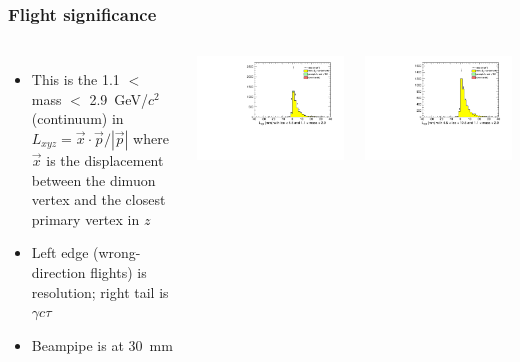 \documentclass[compress]{beamer}
\begin{document}
\begin{frame}
\frametitle{Flight significance}

\begin{columns}
\begin{itemize}
\item This is the 1.1 $<$ mass $<$ 2.9~GeV/$c^2$ (continuum) in
  $L_{xyz} = \vec{x} \cdot \vec{p} / |\vec{p}|$ where $\vec{x}$ is the
  displacement between the dimuon vertex and the closest primary
  vertex in $z$

\item Left edge (wrong-direction flights) is resolution; right tail is $\gamma c \tau$

\item Beampipe is at 30~mm
\end{itemize}

\includegraphics[width=\linewidth]{lowdimuon_lxyz_midmass_isolated.pdf}

\includegraphics[width=\linewidth]{lowdimuon_lxyz_midmass_isosideband.pdf}


\end{columns}
\end{frame}
\end{document}
